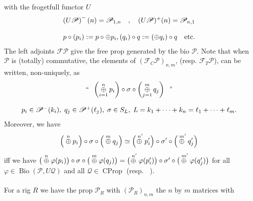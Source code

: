 \documentclass[leqno]{article}
\newcommand{\oplussum}{\mathop{\oplus}}
\newcommand{\biop}{\mathscr{P}}
\DeclareMathOperator{\bio}{Bio}
\DeclareMathOperator{\ctprop}{C_TProp}
\DeclareMathOperator{\cprop}{CProp}
\numberwithin{equation}{section}
\begin{document}
with the frogetfull functor $U$ 
\begin{equation}
				\begin{array}[H]{c}
								\left( U\biop \right)^{-}(n) = \biop_{1,n} \quad , \quad
								(U\biop)^{+}(n)=\biop_{n,1} \\\\
								p\circ (p_{i}):= p\circ {\oplus} p_i, (q_i)\circ q:=
								({\oplus} q_{i})\circ q \quad \text{etc.}
				\end{array}
				\label{eq:10.21}
\end{equation}
The left adjoints $\mathcal{F}\biop$ give the free prop generated by the bio $\biop$. Note
that when $\biop$ is (totally) commutative, the elements of $\left( \mathcal{F}_{C}\biop
\right)_{n,m}$, (resp. $\mathcal{F}_{T}\biop$), can be written, non-uniquely, as 
\begin{equation}
				\begin{array}[H]{c}
				\text{``}\;\; \left( \oplussum\limits_{i=1}^{n} p_i \right)\circ \sigma\circ \left(
				\oplussum\limits_{j=1}^{m}q_{j} \right) \;\; \text{''} \\\\
				p_{i}\in \biop^{-}(k_i), \; q_{j}\in \biop^{+}(\ell_j), \; \sigma\in S_{L}, \;
				L=k_1+\cdots + k_n = \ell_1+\cdots + \ell_m.
				\end{array}
				\label{eq:10.22}
\end{equation}
Moreover, we have
\begin{equation}
				\Big( \overset{n}{\oplus} p_i \Big)\circ \sigma \circ \Big(
				\overset{m}{\oplus}q_{j} \Big) \simeq
        \Big(\overset{n^{\prime}}{\hspace{-1mm}\oplus} p^{\prime}_i\Big)\circ
				\sigma^{\prime}\circ \Big(\overset{m^{\prime}}{\hspace{-1mm}\oplus}
        q_{j}^{\prime}\Big)
				\label{eq:10.23}
\end{equation}
iff we have $\big( \overset{n}{\oplus}\varphi(p_i)\big)\circ \sigma \circ
\big(\overset{m}{\oplus}\varphi(q_j)\big) =  \big(
\overset{n^{\prime}}{\hspace{-1mm}\oplus}\varphi(p^{\prime}_i)\big)\circ \sigma^\prime \circ
\big(\overset{m^{\prime}}{\hspace{-1mm}\oplus}\varphi(q_j^\prime)\big)$
for all $\varphi\in\bio(\biop,U\mathscr{Q})$ and all $\mathscr{Q}\in \cprop$ (resp. $\ctprop$).\\\\
For a rig 
$R$ we have the prop $\biop_{R}$ with $(\biop_{R})_{n,m}$ the $n$ by $m$ matrices with
\end{document}

